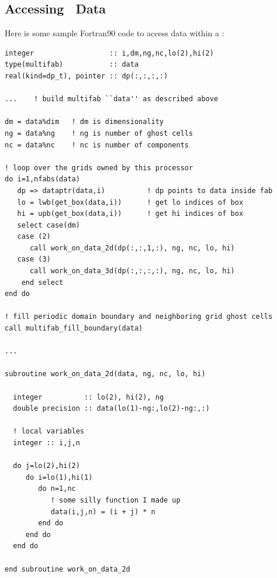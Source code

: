 \subsection{Accessing \MultiFab\ Data}
Here is some sample Fortran90 code to access data within a \MultiFab:
\begin{lstlisting}[backgroundcolor=\color{light-green}]
integer                  :: i,dm,ng,nc,lo(2),hi(2)
type(multifab)           :: data
real(kind=dp_t), pointer :: dp(:,:,:,:)

...    ! build multifab ``data'' as described above

dm = data%dim   ! dm is dimensionality
ng = data%ng    ! ng is number of ghost cells
nc = data%nc    ! nc is number of components

! loop over the grids owned by this processor
do i=1,nfabs(data)
   dp => dataptr(data,i)          ! dp points to data inside fab
   lo = lwb(get_box(data,i))      ! get lo indices of box
   hi = upb(get_box(data,i))      ! get hi indices of box
   select case(dm)
   case (2)
      call work_on_data_2d(dp(:,:,1,:), ng, nc, lo, hi)
   case (3)
      call work_on_data_3d(dp(:,:,:,:), ng, nc, lo, hi)
    end select
end do

! fill periodic domain boundary and neighboring grid ghost cells
call multifab_fill_boundary(data)  

...

subroutine work_on_data_2d(data, ng, nc, lo, hi)

  integer          :: lo(2), hi(2), ng
  double precision :: data(lo(1)-ng:,lo(2)-ng:,:)

  ! local variables
  integer :: i,j,n

  do j=lo(2),hi(2)
     do i=lo(1),hi(1)
        do n=1,nc
           ! some silly function I made up
           data(i,j,n) = (i + j) * n
        end do
     end do
  end do

end subroutine work_on_data_2d
\end{lstlisting}

